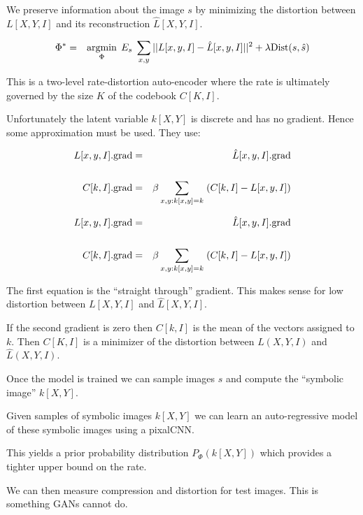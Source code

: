 {We preserve information about the image $s$ by minimizing the distortion between $L[X,Y,I]$ and its reconstruction $\hat{L}[X,Y,I]$.

\vfill
\begin{eqnarray*}
\Phi^* & = & \operatorname*{argmin}_\Phi \;E_s\; \sum_{x,y} ||L[x,y,I] - \hat{L}[x,y,I]||^2 + \lambda \mathrm{Dist}(s,\hat{s})
\end{eqnarray*}

\vfill
This is a two-level rate-distortion auto-encoder where the rate is ultimately governed by the size $K$ of the codebook $C[K,I]$.


Unfortunately the latent variable $k[X,Y]$ is discrete and has no gradient.  Hence some approximation must be used.  They use:

\begin{eqnarray*}
L[x,y,I].\mathrm{grad} & = & \hat{L}[x,y,I].\mathrm{grad} \\
\\
C[k,I].\mathrm{grad} & = & \beta \sum_{x,y: k[x,y] = k}\;(C[k,I] - L[x,y,I])
\end{eqnarray*}


\begin{eqnarray*}
L[x,y,I].\mathrm{grad} & = & \hat{L}[x,y,I].\mathrm{grad} \\
\\
C[k,I].\mathrm{grad} & = & \beta \sum_{x,y: k[x,y] = k}\;(C[k,I] - L[x,y,I])
\end{eqnarray*}

\vfill
The first equation is the ``straight through'' gradient.  This makes sense for low distortion between $L[X,Y,I]$ and $\hat{L}[X,Y,I]$.

\vfill
If the second gradient is zero then $C[k,I]$ is the mean of the vectors assigned to $k$.  Then $C[K,I]$ is a minimizer of the distortion
between $L(X,Y,I)$ and $\hat{L}(X,Y,I)$.


Once the model is trained we can sample images $s$ and compute the ``symbolic image'' $k[X,Y]$.

\vfill
Given samples of symbolic images $k[X,Y]$ we can learn an auto-regressive model of these symbolic images using a pixalCNN.

\vfill
This yields a prior probability distribution $P_\Phi(k[X,Y])$ which provides a tighter upper bound on the rate.

\vfill
We can then measure compression and distortion for test images.  This is something GANs cannot do.

}

